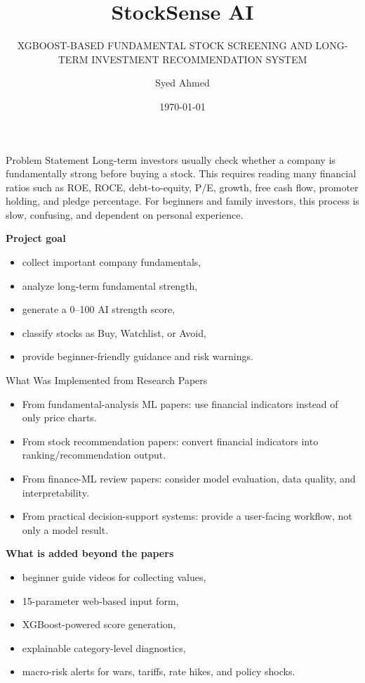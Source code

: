 \documentclass[aspectratio=169]{beamer}
\title{StockSense AI}
\subtitle{XGBOOST-BASED FUNDAMENTAL STOCK SCREENING AND LONG-TERM INVESTMENT RECOMMENDATION SYSTEM}
\author{Syed Ahmed}
\institute{Mini Project / Hackathon Presentation}
\date{\today}
\begin{document}
\begin{frame}
  \titlepage
\end{frame}

\begin{frame}{Problem Statement}
\justifying
Long-term investors usually check whether a company is fundamentally strong before buying a stock. This requires reading many financial ratios such as ROE, ROCE, debt-to-equity, P/E, growth, free cash flow, promoter holding, and pledge percentage. For beginners and family investors, this process is slow, confusing, and dependent on personal experience.

\vspace{0.3cm}
\textbf{Project goal}
\begin{itemize}
  \item collect important company fundamentals,
  \item analyze long-term fundamental strength,
  \item generate a 0--100 AI strength score,
  \item classify stocks as Buy, Watchlist, or Avoid,
  \item provide beginner-friendly guidance and risk warnings.
\end{itemize}
\end{frame}

\begin{frame}{What Was Implemented from Research Papers}
\small
\begin{itemize}
  \item From fundamental-analysis ML papers: use financial indicators instead of only price charts.
  \item From stock recommendation papers: convert financial indicators into ranking/recommendation output.
  \item From finance-ML review papers: consider model evaluation, data quality, and interpretability.
  \item From practical decision-support systems: provide a user-facing workflow, not only a model result.
\end{itemize}

\vspace{0.2cm}
\textbf{What is added beyond the papers}
\begin{itemize}
  \item beginner guide videos for collecting values,
  \item 15-parameter web-based input form,
  \item XGBoost-powered score generation,
  \item explainable category-level diagnostics,
  \item macro-risk alerts for wars, tariffs, rate hikes, and policy shocks.
\end{itemize}
\end{frame}
\end{document}
